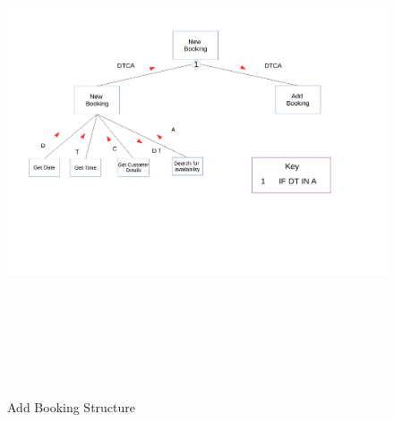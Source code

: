 \begin{figure}[H]
    \includegraphics[height = 15cm, angle = -90]{./Design/Images/structure2}
    \caption{Add Booking Structure} \label{fig:Structure2}
\end{figure}

